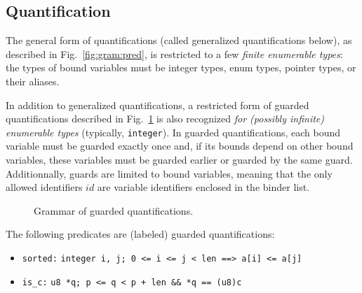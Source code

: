 \subsection*{Quantification}

{\highlightnotimplemented The general form of quantifications (called
    generalized quantifications below), as described in
    Fig.~\ref{fig:gram:pred},
    is restricted to a few \emph{finite enumerable types}: the types of bound
    variables must be \C integer types, enum types, pointer types, or their
    aliases.

}

In addition to generalized quantifications, a restricted form of guarded
quantifications described in Fig.~\ref{fig:gram:guarded} is also recognized
\emph{for (possibly infinite) enumerable types} (typically,
\lstinline|integer|). In guarded quantifications, each bound variable must be
guarded exactly once and, if its bounds depend on other bound variables, these
variables must be guarded earlier or guarded by the same guard. Additionnally,
guards are limited to bound variables, meaning that the only allowed
identifiers $id$ are variable identifiers enclosed in the binder list.

\begin{figure}[htbp]
  \begin{cadre}
    
  \end{cadre}
  \caption{Grammar of guarded quantifications.}
  \label{fig:gram:guarded}
\end{figure}


\begin{example}
  The following predicates are (labeled) guarded quantifications:
  \begin{itemize}
  \item \lstinline|sorted:| \Forall{} \lstinline|integer i, j; 0 <= i <= j < len ==> a[i] <= a[j]|
  \item {\highlightnotimplemented \lstinline|is_c:| \Exists{} \lstinline|u8 *q; p <= q < p + len && *q == (u8)c|}
  \end{itemize}
\end{example}


